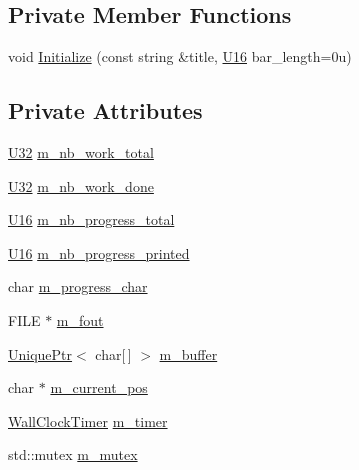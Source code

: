 \subsection*{Private Member Functions}
\begin{DoxyCompactItemize}
\item 
void \hyperlink{classmage_1_1_progress_reporter_1_1_impl_aca61c9f4dc622784124e7812daa1f273}{Initialize} (const string \&title, \hyperlink{namespacemage_af69057eec1ce005c1c3b34ae33486f16}{U16} bar\+\_\+length=0u)
\end{DoxyCompactItemize}
\subsection*{Private Attributes}
\begin{DoxyCompactItemize}
\item 
\hyperlink{namespacemage_a41c104c036fba3756a74e19f793eeaa1}{U32} \hyperlink{classmage_1_1_progress_reporter_1_1_impl_a58c67973a05cb65276612f56ff4409a6}{m\+\_\+nb\+\_\+work\+\_\+total}
\item 
\hyperlink{namespacemage_a41c104c036fba3756a74e19f793eeaa1}{U32} \hyperlink{classmage_1_1_progress_reporter_1_1_impl_ad35ff8031b2826f41912abc44dbd1d24}{m\+\_\+nb\+\_\+work\+\_\+done}
\item 
\hyperlink{namespacemage_af69057eec1ce005c1c3b34ae33486f16}{U16} \hyperlink{classmage_1_1_progress_reporter_1_1_impl_a286a47e68cdbae261b94dd238e1c9328}{m\+\_\+nb\+\_\+progress\+\_\+total}
\item 
\hyperlink{namespacemage_af69057eec1ce005c1c3b34ae33486f16}{U16} \hyperlink{classmage_1_1_progress_reporter_1_1_impl_a06efb1bb26ffbba0cd26db5df79021f8}{m\+\_\+nb\+\_\+progress\+\_\+printed}
\item 
char \hyperlink{classmage_1_1_progress_reporter_1_1_impl_a6796267101fa30e107ed0d5031a8dca3}{m\+\_\+progress\+\_\+char}
\item 
F\+I\+LE $\ast$ \hyperlink{classmage_1_1_progress_reporter_1_1_impl_a1ef149837131c4c615a4be082605f62c}{m\+\_\+fout}
\item 
\hyperlink{namespacemage_a3316d7143a973e37adf1110f2e80ca31}{Unique\+Ptr}$<$ char\mbox{[}$\,$\mbox{]} $>$ \hyperlink{classmage_1_1_progress_reporter_1_1_impl_a0ae90634d05295f7c1a8294e343418e2}{m\+\_\+buffer}
\item 
char $\ast$ \hyperlink{classmage_1_1_progress_reporter_1_1_impl_ab1513044548160ad7a6d181ae2618f1b}{m\+\_\+current\+\_\+pos}
\item 
\hyperlink{namespacemage_a06f4035ef59f07892e594bf1178a108a}{Wall\+Clock\+Timer} \hyperlink{classmage_1_1_progress_reporter_1_1_impl_a8eea94dc2c87abc34d80ad61b5adea2e}{m\+\_\+timer}
\item 
std\+::mutex \hyperlink{classmage_1_1_progress_reporter_1_1_impl_acc8b21e5c74a202b1fb8f80a26132bfc}{m\+\_\+mutex}
\end{DoxyCompactItemize}


